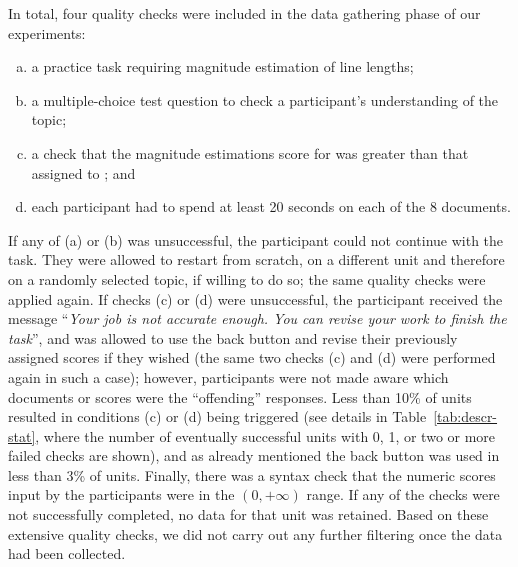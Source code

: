 In total, four quality checks were included in the
data gathering phase of our experiments: 
\begin{enumerate}[(a)]
\item a practice task requiring magnitude estimation of line lengths; 
\item a multiple-choice test question to check a participant's
understanding of the topic; 
\item a check that the magnitude estimations score for \hkh was greater than that
assigned to \nkn; and 
\item each participant had to spend at least 20 seconds on each of the
8 documents.
\end{enumerate}
%
If any of (a) or (b) was unsuccessful, the participant could not
continue with the task.
They were allowed to restart from scratch, on a
different unit and therefore on a randomly selected topic, if willing
to do so; the same quality checks were applied again.
If checks (c) or (d) were unsuccessful, the participant received the
message ``\emph{Your job is not accurate enough.
You can revise your work to finish the task}'', and was allowed to use
the back button and revise their previously assigned scores if they
wished (the same two checks (c) and (d) were performed again in such a
case); however, participants were not made aware which documents or
scores were the ``offending'' responses.
Less than 10\% of units resulted in conditions (c) or (d) being
triggered (see details in Table~\ref{tab:descr-stat}, where the number
of eventually successful units with 0, 1, or two or more failed checks
are shown), and as already mentioned the back button was used in less
than 3\% of units.
Finally, there was a syntax check that the numeric scores input by the
participants were in the $(0,+\infty)$ range.
If any of the checks were not successfully completed, no data for that
unit was retained.
Based on these extensive quality checks, we did not carry out 
any further filtering once the data had been collected.



